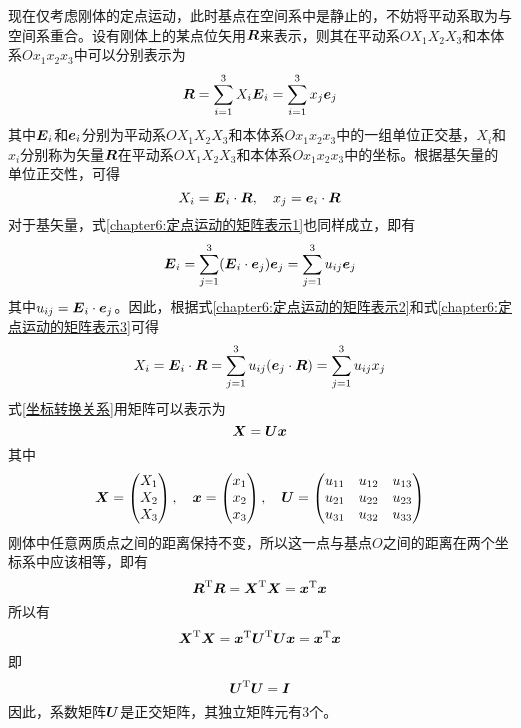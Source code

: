 现在仅考虑刚体的定点运动，此时基点在空间系中是静止的，不妨将平动系取为与空间系重合。设有刚体上的某点位矢用$\boldsymbol{R}$来表示，则其在平动系$OX_1X_2X_3$和本体系$Ox_1x_2x_3$中可以分别表示为
\begin{equation}
	\boldsymbol{R} = \sum_{i=1}^3 X_i \boldsymbol{E}_i = \sum_{i=1}^3 x_j \boldsymbol{e}_j
	\label{chapter6:定点运动的矩阵表示1}
\end{equation}
其中$\boldsymbol{E}_i$和$\boldsymbol{e}_i$分别为平动系$OX_1X_2X_3$和本体系$Ox_1x_2x_3$中的一组单位正交基，$X_i$和$x_i$分别称为矢量$\boldsymbol{R}$在平动系$OX_1X_2X_3$和本体系$Ox_1x_2x_3$中的坐标。根据基矢量的单位正交性，可得
\begin{equation}
	X_i = \boldsymbol{E}_i\cdot \boldsymbol{R},\quad x_j = \boldsymbol{e}_i \cdot \boldsymbol{R}
	\label{chapter6:定点运动的矩阵表示2}
\end{equation}
对于基矢量，式\eqref{chapter6:定点运动的矩阵表示1}也同样成立，即有
\begin{equation}
	\boldsymbol{E}_i = \sum_{j=1}^3 (\boldsymbol{E}_i\cdot \boldsymbol{e}_j) \boldsymbol{e}_j = \sum_{j=1}^3 u_{ij} \boldsymbol{e}_j
	\label{chapter6:定点运动的矩阵表示3}
\end{equation}
其中$u_{ij} = \boldsymbol{E}_i\cdot \boldsymbol{e}_j$。因此，根据式\eqref{chapter6:定点运动的矩阵表示2}和式\eqref{chapter6:定点运动的矩阵表示3}可得
\begin{equation}
	X_i = \boldsymbol{E}_i \cdot \boldsymbol{R} = \sum_{j=1}^3 u_{ij} (\boldsymbol{e}_j \cdot \boldsymbol{R}) = \sum_{j=1}^3 u_{ij} x_j
	\label{坐标转换关系}
\end{equation}
式\eqref{坐标转换关系}用矩阵可以表示为
\begin{equation}
	\boldsymbol{X} = \boldsymbol{U}\boldsymbol{x}
\end{equation}
其中
\begin{equation*}
	\boldsymbol{X} = \begin{pmatrix} X_1 \\ X_2 \\ X_3 \end{pmatrix},\quad \boldsymbol{x} = \begin{pmatrix} x_1 \\ x_2 \\ x_3 \end{pmatrix},\quad \boldsymbol{U} = \begin{pmatrix} u_{11} & u_{12} & u_{13} \\ u_{21} & u_{22} & u_{23} \\ u_{31} & u_{32} & u_{33} \end{pmatrix}
\end{equation*}
刚体中任意两质点之间的距离保持不变，所以这一点与基点$O$之间的距离在两个坐标系中应该相等，即有
\begin{equation*}
	\boldsymbol{R}^{\mathrm{T}} \boldsymbol{R} = \boldsymbol{X}^{\mathrm{T}} \boldsymbol{X} = \boldsymbol{x}^{\mathrm{T}} \boldsymbol{x}
\end{equation*}
所以有
\begin{equation*}
	\boldsymbol{X}^{\mathrm{T}} \boldsymbol{X} = \boldsymbol{x}^{\mathrm{T}} \boldsymbol{U}^{\mathrm{T}} \boldsymbol{U} \boldsymbol{x} = \boldsymbol{x}^{\mathrm{T}} \boldsymbol{x}
\end{equation*}
即
\begin{equation}
	\boldsymbol{U}^{\mathrm{T}} \boldsymbol{U} = \boldsymbol{I}
\end{equation}
因此，系数矩阵$\boldsymbol{U}$是正交矩阵，其独立矩阵元有3个。

